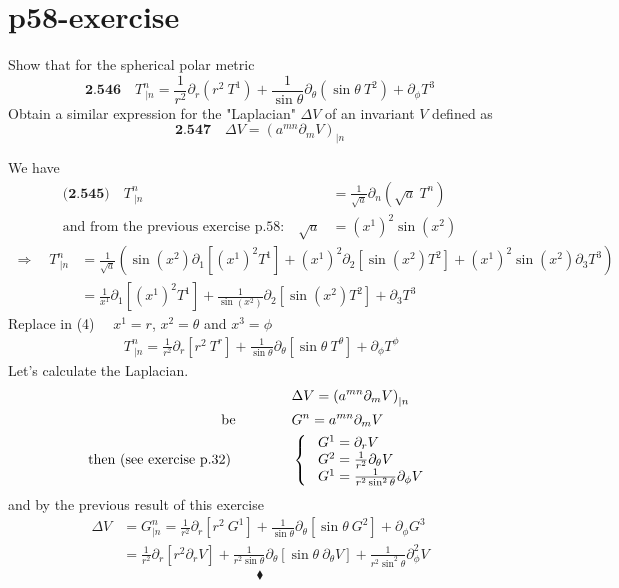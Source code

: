 \section{p58-exercise}
\begin{tcolorbox}
Show that for the spherical polar metric 
$$\textbf{2.546}\quad T^n_{\ |n} = \frac{1}{r^2}\partial_r(r^2 \ T^1) + \frac{1}{\sin \theta }\partial_{\theta}(\sin \theta\  T^2) + \partial_{\phi}T^3 $$
Obtain a similar expression for the "Laplacian" $\Delta V$ of an invariant $V$ defined as $$\textbf{2.547}\quad\Delta V = \left( a^{mn}\partial_m V\right)_{|n}$$
\end{tcolorbox}
We have
\begin{align}
\textbf{(2.545)}\quad T^n_{\ |n} &= \frac{1}{\sqrt{a}}\partial_n(\sqrt{a} \ T^n)\\
\text{and from the previous exercise p.58:}\quad \sqrt{a} &= (x^1)^2\sin(x^2)
\end{align}
\begin{align}
\Rightarrow \quad T^n_{\ |n} &= \frac{1}{\sqrt{a}}\left(\sin(x^2) \partial_1[(x^1)^2 T^1]  + (x^1)^2\partial_2 [ \sin (x^2)T^2] + (x^1)^2 \sin (x^2)\partial_3 T^3 \right)\\
&= \frac{1}{x^1} \partial_1[(x^1)^2 T^1]  + \frac{1}{\sin (x^2)}\partial_2 [ \sin (x^2)T^2] + \partial_3 T^3 
\end{align}
Replace in (4) $\quad x^1 =r$, $x^2 =  \theta$ and $x^3 = \phi$
\begin{align}
\ T^n_{\ |n} = \frac{1}{r^2} \partial_r [r^2 \ T^r]  + \frac{1}{\sin \theta}\partial_{\theta} [ \sin \theta \ T^{\theta}] + \partial_{\phi} T^{\phi} 
\end{align}
Let's calculate the Laplacian.
\begin{align}
&\Delta V = \left( a^{mn}\partial_m V\right)_{|n}\\
\text{be}\quad\quad\quad\quad & G^n = a^{mn}\partial_m V\\
\text{then (see exercise p.32) } \quad\quad\quad\quad & \left\{ \begin{array}{l}
\ G^1 = \partial_r V\\
\ G^2 = \frac{1}{r^2}\partial_{\theta} V\\
\ G^1 = \frac{1}{r^2 \sin ^2 \theta}\partial_{\phi} V\\
\end{array}\right.
\end{align}
and by the previous result of this exercise
\begin{align}
\Delta V &= G^n_{|n} = \frac{1}{r^2} \partial_r [r^2 \ G^1]  + \frac{1}{\sin \theta}\partial_{\theta} [ \sin \theta \ G^{2}] + \partial_{\phi} G^{3} \\
\ &= \frac{1}{r^2} \partial_r [r^2 \partial_r V]  + \frac{1}{r^2 \sin \theta}\partial_{\theta} [ \sin \theta \ \partial_{\theta} V] + \frac{1}{r^2 \sin ^2 \theta}\partial^2_{\phi} V
\end{align}
$$\blacklozenge$$
\newpage

